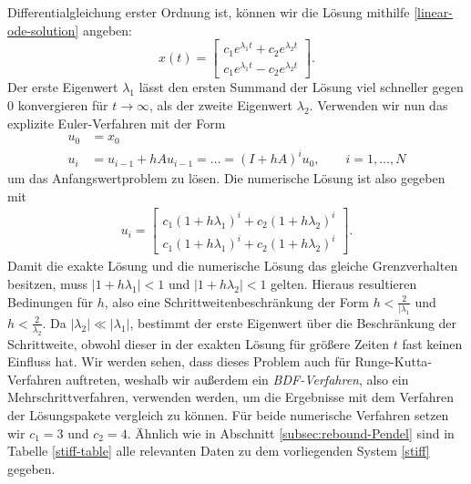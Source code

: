 Differentialgleichung erster Ordnung ist, können wir die Lösung mithilfe \eqref{linear-ode-solution} angeben:
\[
       x(t) =
       \begin{bmatrix}
              c_1 e^{\lambda_1 t} + c_2 e^{\lambda_2 t} \\
              c_1 e^{\lambda_1 t} - c_2 e^{\lambda_2 t}
       \end{bmatrix}.
\]
Der erste Eigenwert $\lambda_1$ lässt den ersten Summand der Lösung viel schneller gegen $0$ konvergieren für
$t \rightarrow \infty$, als der zweite Eigenwert $\lambda_2$. Verwenden wir nun das explizite Euler-Verfahren mit der
Form
\begin{align*}
       u_0 &= x_0 \\
       u_i &= u_{i-1} + hAu_{i-1}= \dots = (I + hA)^{i}u_0, \qquad i=1,\dots,N
\end{align*}
um das Anfangswertproblem zu lösen. Die numerische Lösung ist also gegeben mit
\begin{align*}
       u_{i}=
       \begin{bmatrix}
              c_1 (1+h\lambda_1)^{i} + c_2 (1+h\lambda_2)^{i}\\
              c_1 (1+h\lambda_1)^{i} + c_2 (1+h\lambda_2)^{i}
       \end{bmatrix}.
\end{align*}
Damit die exakte Lösung und die numerische Lösung das gleiche Grenzverhalten besitzen, muss $|1 + h\lambda_1|<1$ und
$|1 + h\lambda_2|<1$ gelten. Hieraus resultieren Bedinungen für $h$, also eine Schrittweitenbeschränkung der Form
$h<\frac{2}{|\lambda_1}$ und $h<\frac{2}{\lambda_2}$. Da $|\lambda_2| \ll |\lambda_1|$, bestimmt der erste Eigenwert
über die Beschränkung der Schrittweite, obwohl dieser in der exakten Lösung für größere Zeiten $t$ fast keinen Einfluss
hat. Wir werden sehen, dass dieses Problem auch für Runge-Kutta-Verfahren auftreten, weshalb wir außerdem ein
\textit{BDF-Verfahren}, also ein Mehrschrittverfahren, verwenden werden, um die Ergebnisse mit dem Verfahren der
Lösungspakete vergleich zu können. Für beide numerische Verfahren setzen wir $c_1=3$ und $c_2=4$. Ähnlich wie in
Abschnitt \ref{subsec:rebound-Pendel} sind in Tabelle \ref{stiff-table} alle relevanten Daten zu dem vorliegenden System
\eqref{stiff} gegeben.
